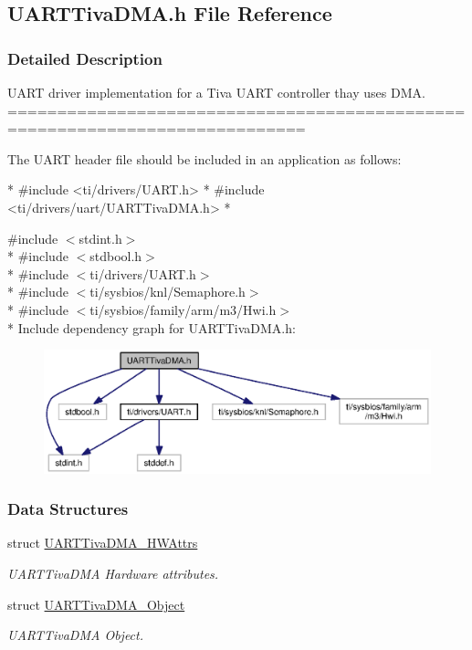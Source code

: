 \subsection{U\-A\-R\-T\-Tiva\-D\-M\-A.\-h File Reference}
\label{_u_a_r_t_tiva_d_m_a_8h}


\subsubsection{Detailed Description}
U\-A\-R\-T driver implementation for a Tiva U\-A\-R\-T controller thay uses D\-M\-A. ============================================================================

The U\-A\-R\-T header file should be included in an application as follows\-: 
\begin{DoxyCode}
*  #include <ti/drivers/UART.h>
*  #include <ti/drivers/uart/UARTTivaDMA.h>
*  
\end{DoxyCode}
 

{\ttfamily \#include $<$stdint.\-h$>$}\\*
{\ttfamily \#include $<$stdbool.\-h$>$}\\*
{\ttfamily \#include $<$ti/drivers/\-U\-A\-R\-T.\-h$>$}\\*
{\ttfamily \#include $<$ti/sysbios/knl/\-Semaphore.\-h$>$}\\*
{\ttfamily \#include $<$ti/sysbios/family/arm/m3/\-Hwi.\-h$>$}\\*
Include dependency graph for U\-A\-R\-T\-Tiva\-D\-M\-A.\-h\-:
\nopagebreak
\begin{figure}[H]
\begin{center}
\leavevmode
\includegraphics[width=350pt]{_u_a_r_t_tiva_d_m_a_8h__incl}
\end{center}
\end{figure}
\subsubsection*{Data Structures}
\begin{DoxyCompactItemize}
\item 
struct \hyperlink{struct_u_a_r_t_tiva_d_m_a___h_w_attrs}{U\-A\-R\-T\-Tiva\-D\-M\-A\-\_\-\-H\-W\-Attrs}
\begin{DoxyCompactList}\small\item\em U\-A\-R\-T\-Tiva\-D\-M\-A Hardware attributes. \end{DoxyCompactList}\item 
struct \hyperlink{struct_u_a_r_t_tiva_d_m_a___object}{U\-A\-R\-T\-Tiva\-D\-M\-A\-\_\-\-Object}
\begin{DoxyCompactList}\small\item\em U\-A\-R\-T\-Tiva\-D\-M\-A Object. \end{DoxyCompactList}\end{DoxyCompactItemize}

